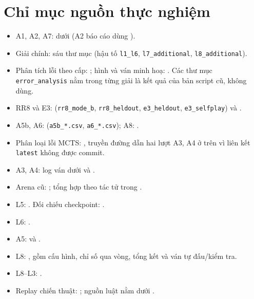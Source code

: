 \section{Chỉ mục nguồn thực nghiệm}
\sloppy
\begin{itemize}
\item A1, A2, A7:  dưới  (A2 báo cáo dùng ).
\item Giải chính: sáu thư mục  (hậu tố \texttt{l1\_l6}, \texttt{l7\_additional}, \texttt{l8\_additional}).
\item Phân tích lỗi theo cấp: ; hình và ván minh hoạ: .
Các thư mục \texttt{error\_analysis} nằm trong từng giải là kết quả của bản script cũ, không dùng.
\item RR8 và E3:  (\texttt{rr8\_mode\_b}, \texttt{rr8\_heldout}, \texttt{e3\_heldout}, \texttt{e3\_selfplay}) và .
\item A5b, A6:  (\texttt{a5b\_*.csv}, \texttt{a6\_*.csv}); A8: .
\item Phân loại lỗi MCTS: , truyền đường dẫn hai lượt A3, A4 ở trên vì liên kết \texttt{latest} không được commit.
\item A3, A4: log ván dưới  và .
\item Arena cũ: ; tổng hợp theo tác tử trong .
\item L5: .
Đối chiếu checkpoint: .
\item L6: .
\item A5:  và .
\item L8: , gồm cấu hình, chỉ số qua vòng, tổng kết và ván tự đấu/kiểm tra.
\item L8--L3: .
\item Replay chiến thuật: ; nguồn luật nằm dưới .
\end{itemize}
\fussy

